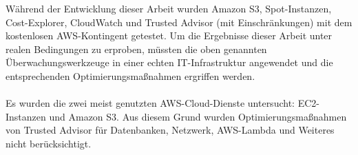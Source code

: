 Während der Entwicklung dieser Arbeit wurden Amazon S3, Spot-Instanzen, Cost-Explorer, CloudWatch und Trusted Advisor (mit Einschränkungen) mit dem kostenlosen AWS-Kontingent getestet. Um die Ergebnisse dieser Arbeit unter realen Bedingungen zu erproben, müssten die oben genannten Überwachungswerkzeuge in einer echten IT-Infrastruktur angewendet und die entsprechenden Optimierungsmaßnahmen ergriffen werden. %
\\\\
Es wurden die zwei meist genutzten AWS-Cloud-Dienste untersucht: EC2-Instanzen und Amazon S3. Aus diesem Grund wurden Optimierungsmaßnahmen von Trusted Advisor für Datenbanken, Netzwerk, AWS-Lambda und Weiteres nicht berücksichtigt.
